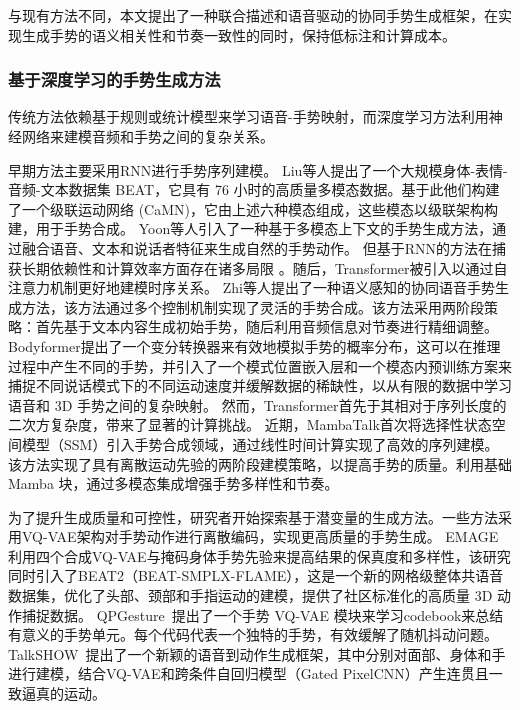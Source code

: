 与现有方法不同，本文提出了一种联合描述和语音驱动的协同手势生成框架，在实现生成手势的语义相关性和节奏一致性的同时，保持低标注和计算成本。

\subsubsection{基于深度学习的手势生成方法}
传统方法依赖基于规则或统计模型来学习语音-手势映射，而深度学习方法利用神经网络来建模音频和手势之间的复杂关系\cite{nyatsanga2023comprehensive}。

早期方法主要采用RNN\cite{liu2022beat,yoon2020speech}进行手势序列建模。
Liu等人\cite{liu2022beat}提出了一个大规模身体-表情-音频-文本数据集 BEAT，它具有 76 小时的高质量多模态数据。基于此他们构建了一个级联运动网络 (CaMN)，它由上述六种模态组成，这些模态以级联架构构建，用于手势合成。
Yoon等人\cite{yoon2020speech}引入了一种基于多模态上下文的手势生成方法，通过融合语音、文本和说话者特征来生成自然的手势动作。
但基于RNN的方法在捕获长期依赖性和计算效率方面存在诸多局限
。随后，Transformer\cite{zhi2023livelyspeaker, pang2023bodyformer}被引入以通过自注意力机制更好地建模时序关系。
Zhi等人\cite{zhi2023livelyspeaker}提出了一种语义感知的协同语音手势生成方法，该方法通过多个控制机制实现了灵活的手势合成。该方法采用两阶段策略：首先基于文本内容生成初始手势，随后利用音频信息对节奏进行精细调整。
Bodyformer\cite{pang2023bodyformer}提出了一个变分转换器来有效地模拟手势的概率分布，这可以在推理过程中产生不同的手势，并引入了一个模式位置嵌入层和一个模态内预训练方案来捕捉不同说话模式下的不同运动速度并缓解数据的稀缺性，以从有限的数据中学习语音和 3D 手势之间的复杂映射。
然而，Transformer首先于其相对于序列长度的二次方复杂度，带来了显著的计算挑战。
近期，MambaTalk\cite{xu2025mambatalk}首次将选择性状态空间模型（SSM）引入手势合成领域，通过线性时间计算实现了高效的序列建模。该方法实现了具有离散运动先验的两阶段建模策略，以提高手势的质量。利用基础 Mamba 块，通过多模态集成增强手势多样性和节奏。

为了提升生成质量和可控性，研究者开始探索基于潜变量的生成方法。一些方法采用VQ-VAE架构对手势动作进行离散编码，实现更高质量的手势生成。
EMAGE~\cite{liu2024emage} 利用四个合成VQ-VAE与掩码身体手势先验来提高结果的保真度和多样性，该研究同时引入了BEAT2（BEAT-SMPLX-FLAME），这是一个新的网格级整体共语音数据集，优化了头部、颈部和手指运动的建模，提供了社区标准化的高质量 3D 动作捕捉数据。
QPGesture~\cite{yang2023qpgesture}提出了一个手势 VQ-VAE 模块来学习codebook来总结有意义的手势单元。每个代码代表一个独特的手势，有效缓解了随机抖动问题。
TalkSHOW~\cite{yi2023generating}提出了一个新颖的语音到动作生成框架，其中分别对面部、身体和手进行建模，结合VQ-VAE和跨条件自回归模型（Gated PixelCNN）产生连贯且一致逼真的运动。

